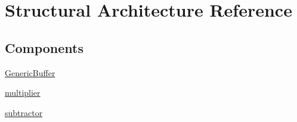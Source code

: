 \hypertarget{class_linear_regression_1_1_structural}{}\section{Structural Architecture Reference}
\label{class_linear_regression_1_1_structural}
\subsection*{Components}
 \begin{DoxyCompactItemize}
\item 
\hyperlink{group___linear_regression_ga26754353fa942392a9799290b42c41c7}{Generic\+Buffer}  {\bfseries }  
\item 
\hyperlink{group___linear_regression_ga3cf9cbfc3e637ae0660c32ceef50386f}{multiplier}  {\bfseries }  
\item 
\hyperlink{group___linear_regression_ga11e2a27abb1e6d6d48bbaae0f5de7aeb}{subtractor}  {\bfseries }  
\end{DoxyCompactItemize}

